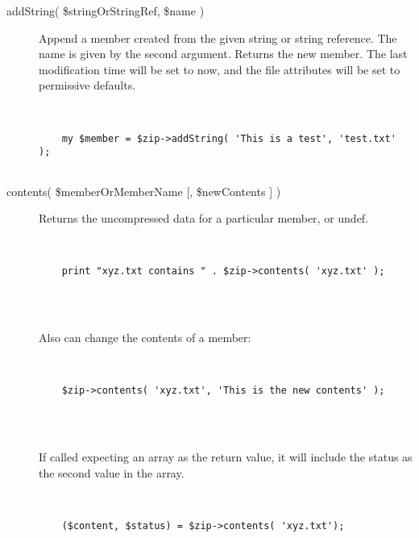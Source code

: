 \documentclass[]{article}
\begin{document}
\begin{description}
\item[addString( \$stringOrStringRef, \$name )]
Append a member created from the given string or string reference. The
name is given by the second argument. Returns the new member. The last
modification time will be set to now, and the file attributes will be
set to permissive defaults.

~

\begin{verbatim}
    my $member = $zip->addString( 'This is a test', 'test.txt' );
    
\end{verbatim}
\end{description}

\begin{description}
\item[contents( \$memberOrMemberName {[}, \$newContents {]} )]
Returns the uncompressed data for a particular member, or undef.

~

\begin{verbatim}
    print "xyz.txt contains " . $zip->contents( 'xyz.txt' );
    
\end{verbatim}

~

Also can change the contents of a member:

~

\begin{verbatim}
    $zip->contents( 'xyz.txt', 'This is the new contents' );
    
\end{verbatim}

~

If called expecting an array as the return value, it will include the
status as the second value in the array.

~

\begin{verbatim}
    ($content, $status) = $zip->contents( 'xyz.txt');
    
\end{verbatim}
\end{description}

\end{document}
